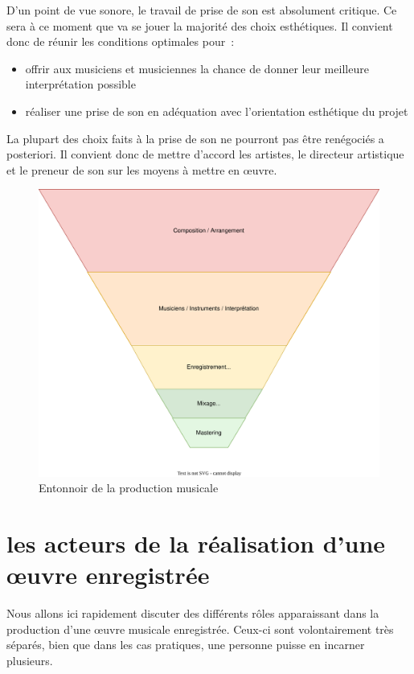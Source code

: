 \documentclass[
]{book}
\providecommand{\tightlist}{%
  \setlength{\itemsep}{0pt}\setlength{\parskip}{0pt}}
\begin{document}
D'un point de vue sonore, le travail de prise de son est absolument critique. Ce sera à ce moment que va se jouer la majorité des choix esthétiques. Il convient donc de réunir les conditions optimales pour~:

\begin{itemize}
\tightlist
\item
  offrir aux musiciens et musiciennes la chance de donner leur meilleure interprétation possible
\item
  réaliser une prise de son en adéquation avec l'orientation esthétique du projet
\end{itemize}

La plupart des choix faits à la prise de son ne pourront pas être renégociés a posteriori. Il convient donc de mettre d'accord les artistes, le directeur artistique et le preneur de son sur les moyens à mettre en œuvre.

\begin{figure}
\includegraphics[width=0.8\linewidth]{_resources/diagrams/productionSonore} \caption{Entonnoir de la production musicale}\label{fig:unnamed-chunk-14}
\end{figure}

\hypertarget{les-acteurs-de-la-ruxe9alisation-dune-ux153uvre-enregistruxe9e}{%
\section{les acteurs de la réalisation d'une œuvre enregistrée}\label{les-acteurs-de-la-ruxe9alisation-dune-ux153uvre-enregistruxe9e}}

Nous allons ici rapidement discuter des différents rôles apparaissant dans la production d'une œuvre musicale enregistrée. Ceux-ci sont volontairement très séparés, bien que dans les cas pratiques, une personne puisse en incarner plusieurs.
\end{document}
